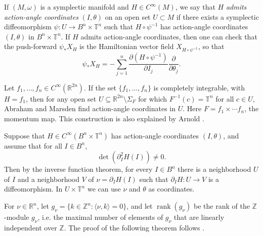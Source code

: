 \documentclass{article}
\newcommand{\rank}{\operatorname{rank}}
\begin{document}
If $(M,\omega)$ is a symplectic manifold and $H \in C^\infty(M)$, we say
that $H$ {\em admits action-angle coordinates} $(I,\theta)$ on an open set
$U \subset M$ if there exists a symplectic diffeomorphism $\psi:U \to
B^n \times \mathbb{T}^n$ such that $H \circ \psi^{-1}$ has action-angle
coordinates $(I,\theta)$ in $B^n \times \mathbb{T}^n$. If $H$ admits action-angle coordinates, then one can check that the push-forward $\psi_* X_H$ is
the Hamiltonian vector field $X_{H \circ \psi^{-1}}$, so that
\[
\psi_* X_H = - \sum_{j=1}^n \frac{\partial(H\circ \psi^{-1})}{\partial I_j}
\frac{\partial}{\partial \theta_j}.
\]

Let $f_1,\ldots,f_n \in C^\infty(\mathbb{R}^{2n})$. If the set
$\{f_1,\ldots,f_n\}$ is completely integrable, with $H=f_1$,
then for any open set $U \subseteq \mathbb{R}^{2n} \setminus \Sigma_F$
for which $F^{-1}(c)=\mathbb{T}^n$ for all $c \in U$, 
Abraham and Marsden \cite[pp. 398--400]{foundations} find action-angle coordinates in $U$.
Here $F=f_1 \times \cdots f_n$, the momentum map.
This construction is also explained by
Arnold \cite[pp. 282--284]{arnold}.

Suppose that $H \in C^\infty(B^n \times \mathbb{T}^n)$ has action-angle
coordinates $(I,\theta)$, and assume that for all $I \in B^n$,
\[
\det (\partial^2_I H (I)) \neq 0.
\]
Then by the inverse function theorem, for every $I \in B^n$ there
is a neighborhood $U$ of $I$ and a neighborhood $V$ of
$\nu=\partial_I H(I)$ such that $\partial_I H:U \to V$ is a diffeomorphism.
In $U \times \mathbb{T}^n$ we can use $\nu$ and $\theta$ as coordinates.

For $\nu \in \mathbb{R}^n$, let $g_\nu=\{k \in \mathbb{Z}^n:\langle \nu,k \rangle=0\}$, and let $\rank(g_\nu)$ be the rank of the $\mathbb{Z}$-module $g_\nu$, 
i.e. the maximal number of elements of $g_\nu$ that are linearly
independent over $\mathbb{Z}$. The proof of the following theorem follows
\cite[Proposition 2.1]{treschev}.
\end{document}
